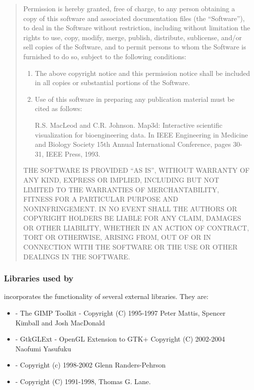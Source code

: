 \begin{quotation}

Permission is hereby granted, free of charge, to any person obtaining a
copy of this software and associated documentation files (the
``Software''), to deal in the Software without restriction, including
without limitation the rights to use, copy, modify, merge, publish,
distribute, sublicense, and/or sell copies of the Software, and to permit
persons to whom the Software is furnished to do so, subject to the
following conditions:
\begin{enumerate}
  \item The above copyright notice and this permission notice shall be
    included in all copies or substantial portions of the Software.
  \item Use of this software in preparing any publication material must be
    cited as follows:
    
    \vspace{0.1in}
    
    R.S. MacLeod and C.R. Johnson. Map3d: Interactive scientific
    visualization for bioengineering data. In IEEE Engineering in
    Medicine and Biology Society 15th Annual International Conference,
    pages 30-31, IEEE Press, 1993.
\end{enumerate}
\vspace{0.1in}

THE SOFTWARE IS PROVIDED ``AS IS'', WITHOUT WARRANTY OF ANY KIND, EXPRESS
OR IMPLIED, INCLUDING BUT NOT LIMITED TO THE WARRANTIES OF MERCHANTABILITY,
FITNESS FOR A PARTICULAR PURPOSE AND NONINFRINGEMENT. IN NO EVENT SHALL THE
AUTHORS OR COPYRIGHT HOLDERS BE LIABLE FOR ANY CLAIM, DAMAGES OR OTHER
LIABILITY, WHETHER IN AN ACTION OF CONTRACT, TORT OR OTHERWISE, ARISING
FROM, OUT OF OR IN CONNECTION WITH THE SOFTWARE OR THE USE OR OTHER
DEALINGS IN THE SOFTWARE.
\end{quotation}


\subsubsection{Libraries used by \map{}}

\map{} incorporates the functionality of several external libraries.  They
are:
\begin{itemize}
  \item {} - The GIMP Toolkit -
    Copyright (C) 1995-1997 Peter Mattis, Spencer Kimball and Josh
    MacDonald 
  \item {} -
    GtkGLExt - OpenGL Extension to GTK+ Copyright (C) 2002-2004  Naofumi
    Yasufuku 
  \item {} - Copyright (c)
    1998-2002 Glenn Randers-Pehrson 
  \item {} - Copyright (C)
    1991-1998, Thomas G. Lane.
\end{itemize}

